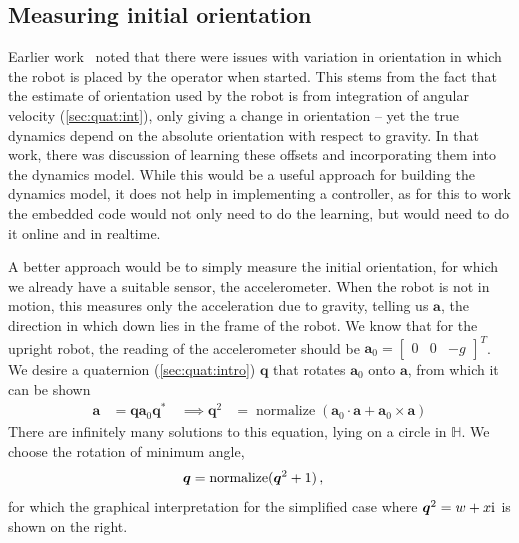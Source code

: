 \documentclass[main.tex]{subfiles}
\begin{document}
\subsection{Measuring initial orientation}
\label{sec:acc:orient}
	Earlier work~\cite{aleksi} noted that there were issues with variation in orientation in which the robot is placed by the operator when started.
	This stems from the fact that the estimate of orientation used by the robot is from integration of angular velocity (\cref{sec:quat:int}), only giving a change in orientation -- yet the true dynamics depend on the absolute orientation with respect to gravity.
	In that work, there was discussion of learning these offsets and incorporating them into the dynamics model.
	While this would be a useful approach for building the dynamics model, it does not help in implementing a controller, as for this to work the embedded code would not only need to do the learning, but would need to do it online and in realtime.

	A better approach would be to simply measure the initial orientation, for which we already have a suitable sensor, the accelerometer. When the robot is not in motion, this measures only the acceleration due to gravity, telling us $\bm{a}$, the direction in which down lies in the frame of the robot.
	We know that for the upright robot, the reading of the accelerometer should be $\bm{a}_0 = \begin{bmatrix}0 & 0 & -g\end{bmatrix}^T$\footnotemark. We desire a quaternion (\cref{sec:quat:intro}) $\bm{q}$ that rotates $\bm{a}_0$ onto $\bm{a}$, from which it can be shown
	\begin{align}
		\bm{a} &= \bm{q}\bm{a}_0\bm{q}^*\, & \implies
		\bm{q}^2
			&= \operatorname{normalize}\left(
				\bm{a}_0 \cdot \bm{a} + \bm{a}_0 \times \bm{a}
			\right)
			\label{eq:quat-sqrt}
	\end{align}
	There are infinitely many solutions to this equation, lying on a circle in $\mathbb{H}$.
	We choose the rotation of minimum angle,
	\begin{align}
		\bm{q} &= \operatorname{normalize}(\bm{q}^2 + 1)\,, &
		\parbox{\linewidth/5}{%
			
		}
	\end{align}
	for which the  graphical interpretation for the simplified case where $\bm{q}^2 = w + x\mathrm{i}\mkern1mu$ is shown on the right.
\end{document}
